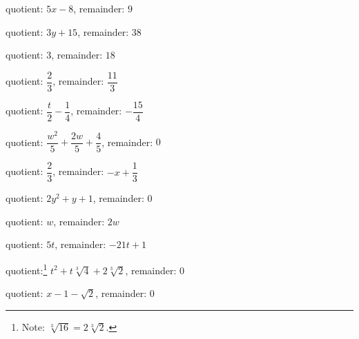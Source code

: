 \begin{tasks}[resume]
\task quotient: $5x-8$, remainder: $9$ 

\task quotient: $3y+15$, remainder: $38$

\task quotient: $3$, remainder: $18$ 

\task quotient: $\dfrac{2}{3}$, remainder: $\dfrac{11}{3}$

\task quotient: $\dfrac{t}{2} - \dfrac{1}{4}$, remainder: $-\dfrac{15}{4}$ 

\task quotient: $\dfrac{w^2}{5} + \dfrac{2w}{5} + \dfrac{4}{5}$, remainder: $0$

\task quotient: $\dfrac{2}{3}$, remainder: $-x + \dfrac{1}{3}$

\task quotient:  $2y^2+y+1$, remainder: $0$ 

\task quotient: $w$, remainder: $2w$

\task quotient: $5t$, remainder: $-21t + 1$

\task quotient:\footnote{Note: $\sqrt[3]{16} = 2\sqrt[3]{2}$.} $t^2 + t \sqrt[3]{4} + 2\sqrt[3]{2}$, remainder: $0$

\task quotient: $x -1 - \sqrt{2}$, remainder: 0  

\end{tasks}
